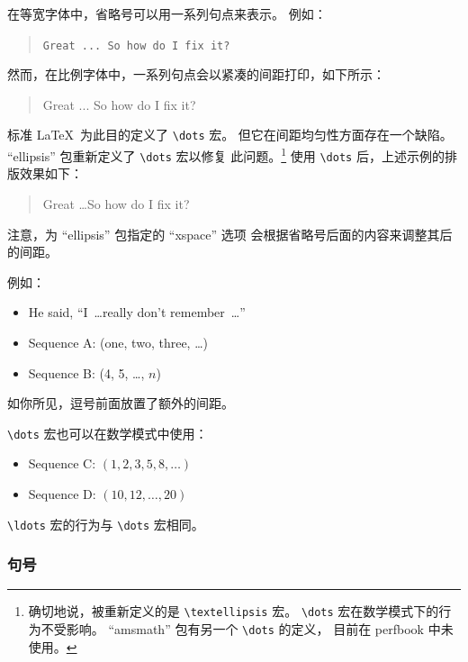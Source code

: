 在等宽字体中，省略号可以用一系列句点来表示。
例如：

\begin{quote}
  \verb|Great ... So how do I fix it?|
\end{quote}

然而，在比例字体中，一系列句点会以紧凑的间距打印，如下所示：

\begin{quote}
  Great ... So how do I fix it?
\end{quote}

标准 \LaTeX\ 为此目的定义了 \verb|\dots| 宏。
但它在间距均匀性方面存在一个缺陷。
``ellipsis'' 包重新定义了 \verb|\dots| 宏以修复
此问题。\footnote{确切地说，被重新定义的是 \texttt{\textbackslash textellipsis} 宏。
  \texttt{\textbackslash dots} 宏在数学模式下的行为不受影响。
  ``amsmath'' 包有另一个 \texttt{\textbackslash dots} 的定义，
  目前在 perfbook 中未使用。}
使用 \verb|\dots| 后，上述示例的排版效果如下：

\begin{quote}
  Great \dots So how do I fix it?
\end{quote}

注意，为 ``ellipsis'' 包指定的 ``xspace'' 选项
会根据省略号后面的内容来调整其后的间距。

例如：

\begin{itemize}[itemsep=.2ex]
\item He said, ``I~\dots really don't remember~\dots''
\item Sequence A: (one, two, three, \dots)
\item Sequence B: (4, 5, \dots, $n$)
\end{itemize}

如你所见，逗号前面放置了额外的间距。

\verb|\dots| 宏也可以在数学模式中使用：

\begin{itemize}[itemsep=.2ex]
\item Sequence C: $(1, 2, 3, 5, 8, \dots)$
\item Sequence D: $(10, 12, \dots, 20)$
\end{itemize}

\verb|\ldots| 宏的行为与 \verb|\dots| 宏相同。

\subsubsection{句号}
\label{sec:app:styleguide:Full Stop}

